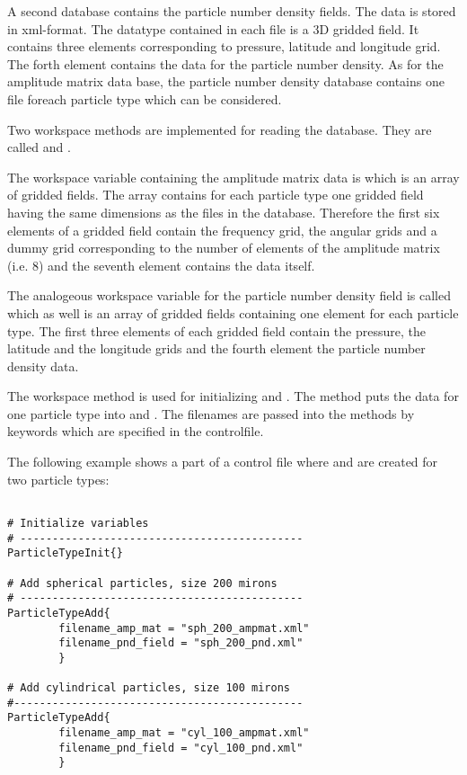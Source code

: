 \label{sec:scattering:pnd_data}

A second database contains the particle number density fields. The
data is stored in xml-format. The datatype contained in each file is a
3D gridded field. It contains three elements corresponding to 
pressure, latitude and longitude grid. The forth element contains the
data for the particle number density. As for the amplitude matrix data
base, the particle number density database contains one file foreach
particle type which can be considered.

\label{sec:scattering:read_data}

Two workspace methods are implemented for reading the database. They
are called  and . 

The workspace variable containing the amplitude matrix data is
 which is an array of gridded fields. The
array contains for each particle type one gridded field having the
same dimensions as the files in the database. Therefore the first six
elements of a gridded field contain the
frequency grid, the angular grids and a dummy grid corresponding
to the number of
elements of the amplitude matrix (i.e. 8) and the seventh element 
contains the data itself.

The analogeous workspace variable for the particle number density
field is called  which as well is an array of
gridded fields containing one element for each particle type. The
first three elements of each gridded field contain the pressure, the
latitude and the longitude grids and the fourth element the particle
number density data. 

The workspace method  is used for initializing
 and . 
The method  puts the data for one particle
type into  and . The
filenames are passed into the methods by keywords which are specified
in the controlfile.

The following example shows a part of a control file where
 and   are created
for two particle types:

\begin{verbatim}

# Initialize variables
# --------------------------------------------
ParticleTypeInit{}

# Add spherical particles, size 200 mirons
# --------------------------------------------
ParticleTypeAdd{
        filename_amp_mat = "sph_200_ampmat.xml" 
        filename_pnd_field = "sph_200_pnd.xml"
        }       

# Add cylindrical particles, size 100 mirons
#---------------------------------------------
ParticleTypeAdd{
        filename_amp_mat = "cyl_100_ampmat.xml" 
        filename_pnd_field = "cyl_100_pnd.xml"
        }   

\end{verbatim}
 
